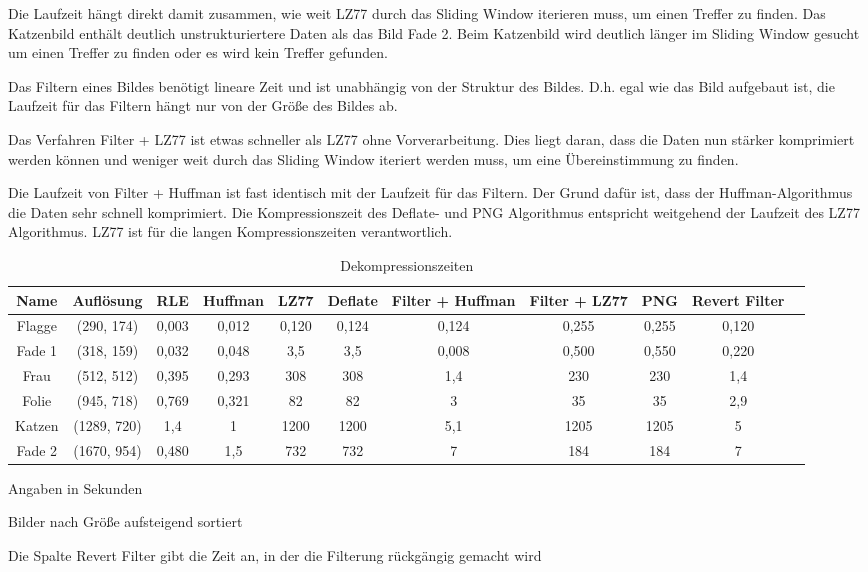 \documentclass[conference]{IEEEtran}
\begin{document}
Die Laufzeit hängt direkt damit zusammen, wie weit LZ77 durch das
Sliding Window iterieren muss, um einen Treffer zu finden.
Das Katzenbild enthält deutlich unstrukturiertere Daten als das Bild
Fade 2.
Beim Katzenbild wird deutlich länger im Sliding Window gesucht um
einen Treffer zu finden oder es wird kein Treffer gefunden.

Das Filtern eines Bildes benötigt lineare Zeit und ist unabhängig
von der Struktur des Bildes.
D.h. egal wie das Bild aufgebaut ist, die Laufzeit für das Filtern
hängt nur von der Größe des Bildes ab.

Das Verfahren Filter + LZ77 ist etwas schneller als LZ77 ohne Vorverarbeitung.
Dies liegt daran, dass die Daten nun stärker komprimiert werden können und
weniger weit durch das Sliding Window iteriert werden muss, um eine
Übereinstimmung zu finden.

Die Laufzeit von Filter + Huffman ist fast identisch mit der Laufzeit
für das Filtern.
Der Grund dafür ist, dass der Huffman-Algorithmus die Daten sehr
schnell komprimiert.
Die Kompressionszeit des Deflate- und PNG Algorithmus entspricht
weitgehend der Laufzeit des LZ77 Algorithmus.
LZ77 ist für die langen Kompressionszeiten verantwortlich.


\begin{table}
  \renewcommand*{\arraystretch}{1.1}
  \centering
  \begin{threeparttable}
    \caption{Dekompressionszeiten}
    \begin{tabular}{c *9{c} S[table-format=5.9]}
      \toprule
      Name   & Auflösung   & RLE   & Huffman & LZ77  & Deflate & Filter + Huffman & Filter + LZ77 & PNG   & Revert Filter \\
      \midrule
      Flagge & (290, 174)  & 0,003 & 0,012   & 0,120 & 0,124   & 0,124            & 0,255         & 0,255 & 0,120         \\
      Fade 1 & (318, 159)  & 0,032 & 0,048   & 3,5   & 3,5     & 0,008            & 0,500         & 0,550 & 0,220         \\
      Frau   & (512, 512)  & 0,395 & 0,293   & 308   & 308     & 1,4              & 230           & 230   & 1,4           \\
      Folie  & (945, 718)  & 0,769 & 0,321   & 82    & 82      & 3                & 35            & 35    & 2,9           \\
      Katzen & (1289, 720) & 1,4   & 1       & 1200  & 1200    & 5,1              & 1205          & 1205  & 5             \\
      Fade 2 & (1670, 954) & 0,480 & 1,5     & 732   & 732     & 7                & 184           & 184   & 7
    \end{tabular}
    \par{} Angaben in Sekunden
    \par{} Bilder nach Größe aufsteigend sortiert
    \par{} Die Spalte Revert Filter gibt die Zeit an, in der die Filterung rückgängig gemacht wird
    \label{tab:dekompzeiten}
  \end{threeparttable}

\end{table}
\end{document}
